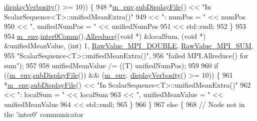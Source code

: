 \begin{DoxyCode}
      \hyperlink{class_q_u_e_s_o_1_1_base_environment_a1fe5f244fc0316a0ab3e37463f108b96}{displayVerbosity}() >= 10)) \{
948         *\hyperlink{class_q_u_e_s_o_1_1_scalar_sequence_a71618cd6351b29361b437af68447a4c8}{m\_env}.\hyperlink{class_q_u_e_s_o_1_1_base_environment_a8a0064746ae8dddfece4229b9ad374d6}{subDisplayFile}() << \textcolor{stringliteral}{"In ScalarSequence<T>::unifiedMeanExtra()"}
949                                 << \textcolor{stringliteral}{": numPos = "}        << numPos
950                                 << \textcolor{stringliteral}{", unifiedNumPos = "} << unifiedNumPos
951                                 << std::endl;
952       \}
953 
954       \hyperlink{class_q_u_e_s_o_1_1_scalar_sequence_a71618cd6351b29361b437af68447a4c8}{m\_env}.\hyperlink{class_q_u_e_s_o_1_1_base_environment_a689e4d140c74d495d97eb498714a4b82}{inter0Comm}().\hyperlink{class_q_u_e_s_o_1_1_mpi_comm_a72e137e60ef8060efb1ee5fc874fa4b8}{Allreduce}((\textcolor{keywordtype}{void} *) &localSum, (\textcolor{keywordtype}{void} *) &unifiedMeanValue, 
      (\textcolor{keywordtype}{int}) 1, \hyperlink{_mpi_comm_8h_ad0f503bd9fecfe4e570ca3d15aaf2518}{RawValue\_MPI\_DOUBLE}, \hyperlink{_mpi_comm_8h_afbf78d291c032aa7f512bc566cee2bd1}{RawValue\_MPI\_SUM},
955                                    \textcolor{stringliteral}{"ScalarSequence<T>::unifiedMeanExtra()"},
956                                    \textcolor{stringliteral}{"failed MPI.Allreduce() for sum"});
957 
958       unifiedMeanValue /= ((T) unifiedNumPos);
959 
960       \textcolor{keywordflow}{if} ((\hyperlink{class_q_u_e_s_o_1_1_scalar_sequence_a71618cd6351b29361b437af68447a4c8}{m\_env}.\hyperlink{class_q_u_e_s_o_1_1_base_environment_a8a0064746ae8dddfece4229b9ad374d6}{subDisplayFile}()) && (\hyperlink{class_q_u_e_s_o_1_1_scalar_sequence_a71618cd6351b29361b437af68447a4c8}{m\_env}.
      \hyperlink{class_q_u_e_s_o_1_1_base_environment_a1fe5f244fc0316a0ab3e37463f108b96}{displayVerbosity}() >= 10)) \{
961         *\hyperlink{class_q_u_e_s_o_1_1_scalar_sequence_a71618cd6351b29361b437af68447a4c8}{m\_env}.\hyperlink{class_q_u_e_s_o_1_1_base_environment_a8a0064746ae8dddfece4229b9ad374d6}{subDisplayFile}() << \textcolor{stringliteral}{"In ScalarSequence<T>::unifiedMeanExtra()"}
962                                 << \textcolor{stringliteral}{": localSum = "}         << localSum
963                                 << \textcolor{stringliteral}{", unifiedMeanValue = "} << unifiedMeanValue
964                                 << std::endl;
965       \}
966     \}
967     \textcolor{keywordflow}{else} \{
968       \textcolor{comment}{// Node not in the 'inter0' communicator}

\end{DoxyCode}
